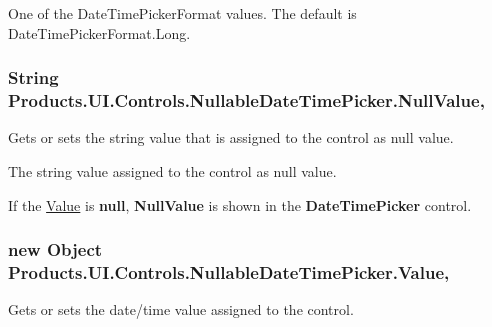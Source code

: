One of the Date\+Time\+Picker\+Format values. The default is Date\+Time\+Picker\+Format.\+Long.
\subsubsection[{\texorpdfstring{Null\+Value}{NullValue}}]{\setlength{\rightskip}{0pt plus 5cm}String Products.\+U\+I.\+Controls.\+Nullable\+Date\+Time\+Picker.\+Null\+Value\hspace{0.3cm}{\ttfamily [get]}, {\ttfamily [set]}}\hypertarget{class_products_1_1_u_i_1_1_controls_1_1_nullable_date_time_picker_af74f08ca7e55f46e32b31e053c733157}{}\label{class_products_1_1_u_i_1_1_controls_1_1_nullable_date_time_picker_af74f08ca7e55f46e32b31e053c733157}


Gets or sets the string value that is assigned to the control as null value. 

The string value assigned to the control as null value.

If the \hyperlink{class_products_1_1_u_i_1_1_controls_1_1_nullable_date_time_picker_a9091a86904f5dc84062fcef8e57cc28b}{Value} is {\bfseries null}, {\bfseries Null\+Value} is shown in the {\bfseries Date\+Time\+Picker} control. 
\subsubsection[{\texorpdfstring{Value}{Value}}]{\setlength{\rightskip}{0pt plus 5cm}new Object Products.\+U\+I.\+Controls.\+Nullable\+Date\+Time\+Picker.\+Value\hspace{0.3cm}{\ttfamily [get]}, {\ttfamily [set]}}\hypertarget{class_products_1_1_u_i_1_1_controls_1_1_nullable_date_time_picker_a9091a86904f5dc84062fcef8e57cc28b}{}\label{class_products_1_1_u_i_1_1_controls_1_1_nullable_date_time_picker_a9091a86904f5dc84062fcef8e57cc28b}


Gets or sets the date/time value assigned to the control. 

